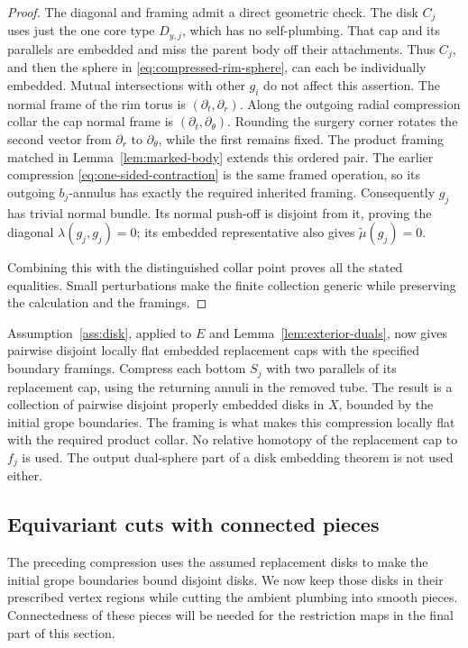 \begin{proof}
The diagonal and framing admit a direct geometric check. The disk
\(C_j\) uses just the one core type \(D_{y,j}\), which has no self-plumbing.
That cap and its parallels are embedded and miss the parent body off their
attachments. Thus \(C_j\), and then the sphere in
\eqref{eq:compressed-rim-sphere}, can each be individually embedded.
Mutual intersections with other \(g_i\) do not affect this assertion.
The normal frame of the rim torus is
\((\partial_t,\partial_r)\). Along the outgoing radial compression collar
the cap normal frame is \((\partial_t,\partial_\theta)\).
Rounding the surgery corner rotates the second vector from
\(\partial_r\) to \(\partial_\theta\), while the first remains fixed.
The product framing matched in Lemma~\ref{lem:marked-body} extends this
ordered pair. The earlier compression \eqref{eq:one-sided-contraction}
is the same framed operation, so its outgoing \(b_j\)-annulus has exactly
the required inherited framing. Consequently \(g_j\) has trivial normal
bundle. Its normal push-off is disjoint from it, proving the diagonal
\(\lambda(g_j,g_j)=0\); its embedded representative also gives
\(\widetilde\mu(g_j)=0\).

Combining this with the distinguished collar point proves all the stated
equalities. Small perturbations make the finite collection generic while
preserving the calculation and the framings.
\end{proof}

Assumption~\ref{ass:disk}, applied to \(E\) and
Lemma~\ref{lem:exterior-duals}, now gives pairwise disjoint locally flat
embedded replacement caps with the specified boundary framings.
Compress each bottom \(S_j\) with two parallels of its replacement cap,
using the returning annuli in the removed tube. The result is a collection
of pairwise disjoint properly embedded disks in \(X\), bounded by the
initial grope boundaries. The framing is what makes this compression
locally flat with the required product collar. No relative homotopy of
the replacement cap to \(f_j\) is used. The output dual-sphere part of a
disk embedding theorem is not used either.

\subsection{Equivariant cuts with connected pieces}

The preceding compression uses the assumed replacement disks to make
the initial grope boundaries bound disjoint disks. We now keep those
disks in their prescribed vertex regions while cutting the ambient
plumbing into smooth pieces. Connectedness of these pieces will be
needed for the restriction maps in the final part of this section.

